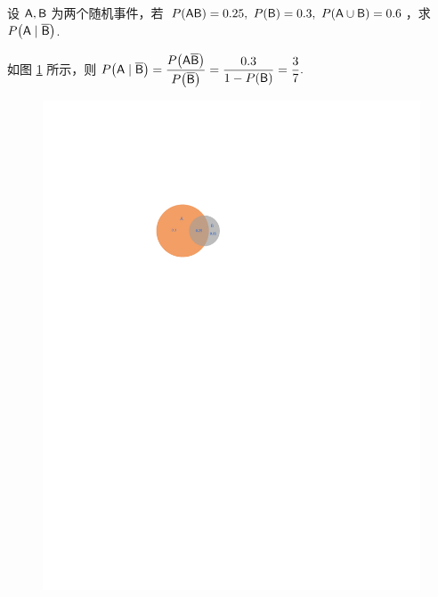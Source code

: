 \begin{example}
    设 $\mathsf{A},\mathsf{B}$ 为两个随机事件，若 $P(\mathsf{AB})=0.25,~P(\mathsf{B})=0.3,~P(\mathsf{A}\cup\mathsf{B})=0.6$，求 $P\qty(\mathsf{A}\mid\overline{\mathsf{B}})$.
\end{example}
\begin{solution}
    如图 \ref{figures/ven1.pdf} 所示，则 $P\qty(\mathsf{A}\mid\overline{\mathsf{B}})=\dfrac{P\qty(\mathsf{A\overline{B}})}{P\qty(\overline{\mathsf{B}})}=\dfrac{0.3}{1-P(\mathsf{B})}=\dfrac{3}{7}.$
\end{solution}

\begin{minipage}[b]{0.3\linewidth}
    \begin{figure}[H]
        \centering
        \includegraphics[scale=0.8]{figures/ven1.pdf}
        \caption{}
        \label{figures/ven1.pdf}
    \end{figure}
\end{minipage}\hfill
